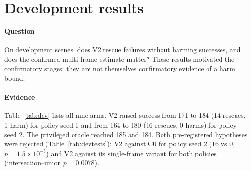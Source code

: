 \section{Development results}\label{sec:dev}

\paragraph{Question} On development scenes, does V2 rescue failures without harming successes, and does the confirmed multi-frame estimate matter? These results motivated the confirmatory stages; they are not themselves confirmatory evidence of a harm bound.

\begin{table}[!htbp]
\centering\footnotesize
\caption{Development stage (C1, seeds 51100--51299): successes of 200 scenes, rescues and harms against C0, and number of scenes in which the arm moved. The trigger fired in 195 (seed 1) and 191 (seed 2) scenes. For the oracle the column counts the scenes in which it entered its control loop (every trigger); it actually moved in 93 and 102.}\label{tab:dev}
\resizebox{\linewidth}{!}{}
\end{table}

\begin{table}[!htbp]
\centering\footnotesize
\caption{Pre-registered development hypotheses (exact one-sided paired tests on discordant scenes; Holm over the two hypotheses at $\alpha=0.05$, i.e.\ the smaller p-value is compared with 0.025 and the larger with 0.05; IU = intersection--union, whose p-value is the larger of the two per-policy p-values).}\label{tab:devtests}
\resizebox{\linewidth}{!}{}
\end{table}

\paragraph{Evidence} Table~\ref{tab:dev} lists all nine arms. V2 raised success from 171 to 184 (14 rescues, 1 harm) for policy seed 1 and from 164 to 180 (16 rescues, 0 harms) for policy seed 2. The privileged oracle reached 185 and 184. Both pre-registered hypotheses were rejected (Table~\ref{tab:devtests}): V2 against C0 for policy seed 2 ($16$ vs $0$, $p=1.5\times10^{-5}$) and V2 against its single-frame variant for both policies (intersection--union $p=0.0078$).

